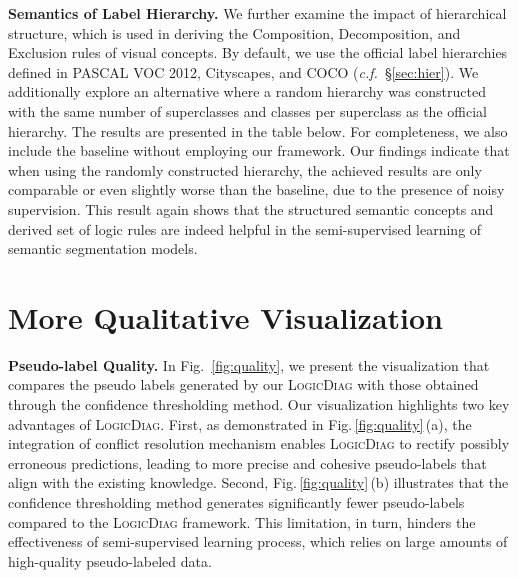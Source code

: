 \documentclass[10pt,twocolumn,letterpaper]{article}
\def\Ours{{\textsc{LogicDiag}}}
\begin{document}
\noindent\textbf{Semantics of Label Hierarchy.} 
We further examine the impact of hierarchical structure, which is used in deriving the Composition, Decomposition, and Exclusion  rules of visual concepts. By default, we use the official label hierarchies defined in PASCAL VOC 2012, Cityscapes, and COCO  (\textit{c.f.\!}~\S\ref{sec:hier}). We additionally explore an alternative where a random hierarchy was constructed with the same number of superclasses and classes per superclass as the official hierarchy. The results are presented in the table below.
For completeness, we also include the baseline without employing our framework. 
Our findings indicate that when using the randomly constructed hierarchy, the achieved results are only comparable or even slightly worse than the baseline, due to the presence of noisy supervision. This result again shows that the structured semantic concepts and derived set of logic rules are indeed helpful in the semi-supervised learning of semantic segmentation models.

\vspace{-4pt}
\begin{table}[h]
  \centering\small
    \vspace{-6pt}
    \captionsetup{font=small}
    \caption{\small \textbf{Impact of semantics within label hierarchy}, evaluated on PASCAL VOC 2012~\cite{everingham2015pascal} \texttt{val} with 1/16 \textit{augmented} set.}
    \label{table:cityscapes}
\end{table}


\section{More Qualitative Visualization}\label{sec:qualitative}
\noindent\textbf{Pseudo-label Quality.} 
In Fig.~\ref{fig:quality}, we present the visualization that compares the pseudo labels generated by our {\Ours} with those obtained through the confidence thresholding method.
Our visualization highlights two key advantages of {\Ours}. 
First, as demonstrated in Fig.\,\ref{fig:quality}\,(a), the integration of conflict resolution mechanism enables {\Ours} to rectify possibly erroneous predictions, leading to more precise and cohesive pseudo-labels that align with the existing knowledge.
Second, Fig.\,\ref{fig:quality}\,(b) illustrates that the confidence thresholding method generates significantly fewer pseudo-labels compared to the {\Ours} framework. This limitation, in turn, hinders the effectiveness of semi-supervised learning process, which relies on large amounts of high-quality pseudo-labeled data.
\end{document}
